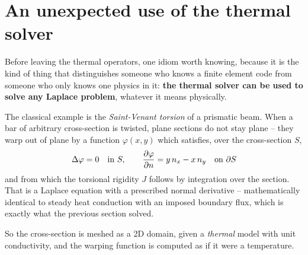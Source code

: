 \section{An unexpected use of the thermal solver}
\label{sec:elas:torsion}

%
%
%
%
%
Before leaving the thermal operators, one idiom worth knowing, because it is
the kind of thing that distinguishes someone who knows a finite element code
from someone who only knows one physics in it: \textbf{the thermal solver can
be used to solve any Laplace problem}, whatever it means physically.

The classical example is the \emph{Saint-Venant torsion} of a prismatic beam.
When a bar of arbitrary cross-section is twisted, plane sections do not stay
plane -- they warp out of plane by a function $\varphi(x,y)$ which satisfies,
over the cross-section $S$,
\begin{equation}
  \Delta \varphi = 0 \quad \text{in } S,
  \qquad
  \frac{\partial \varphi}{\partial n} = y\,n_{x} - x\,n_{y} \quad \text{on } \partial S
\label{eq:elas:warping}
\end{equation}
and from which the torsional rigidity $J$ follows by integration over the
section. That is a Laplace equation with a prescribed normal derivative --
mathematically identical to steady heat conduction with an imposed boundary
flux, which is exactly what the previous section solved.

So the cross-section is meshed as a 2D domain, given a \emph{thermal} model
with unit conductivity, and the warping function is computed as if it were a
temperature.

